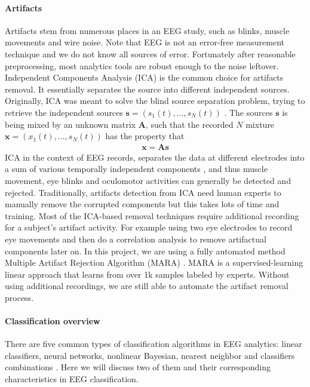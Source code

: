 \documentclass[a4paper,11pt,oneside]{article}
\begin{document}
\paragraph{Artifacts}
Artifacts  stem from numerous places in an EEG study, such as blinks, muscle movements and wire noise. Note that EEG is not an error-free measurement technique and we do not know all sources of error. Fortunately after reasonable preprocessing, most analytics tools are robust enough to the noise leftover. Independent Components Analysis (ICA) is the common choice for artifacts removal. It essentially separates the source into different independent sources. Originally, ICA was meant to solve the blind source separation problem, trying to retrieve the independent sources $ \mathbf{s} = ({s_1(t), \dots, s_N(t)})$ \cite{comon1994independent}. The sources $\mathbf{s}$ is being mixed by an unknown matrix $\mathbf{A}$, such that the recorded $N$ mixture $ \mathbf{x} = ({x_1(t), \dots, s_N(t)})$ has the property that 
\begin{align}
\mathbf{x = As}
\end{align} 
ICA in the context of EEG records, separates the data at different electrodes into a sum of various temporally independent components \cite{jung2000removing}, and thus muscle movement, eye blinks and oculomotor activities can generally be detected and rejected.  Traditionally, artifacts detection from ICA need human experts to manually remove the corrupted components but this takes lots of time and training. Most of the ICA-based removal techniques require additional recording for a subject's artifact activity. For example using two eye electrodes to record eye movements and then do a correlation analysis to remove artifactual  components later on. In this project, we are using a fully automated method  Multiple Artifact Rejection Algorithm (MARA) \cite{Winkler2011}. MARA is a supervised-learning linear approach that learns from over 1k samples labeled by experts. Without using additional recordings, we are still able to automate the artifact removal process.  


\paragraph{Classification overview}
There are five common types of classification algorithms in EEG analytics: linear classifiers, neural networks, nonlinear Bayesian, nearest neighbor and classifiers combinations \cite{lotte2007review}. Here we will discuss two of them and their corresponding characteristics in EEG classification.
\end{document}
